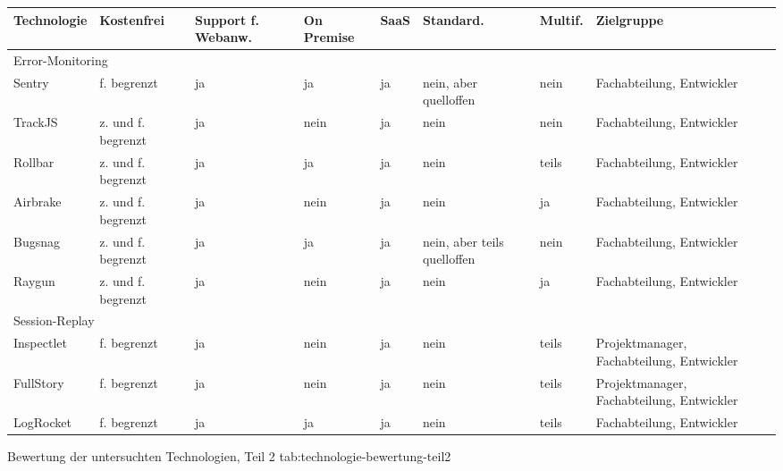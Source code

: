 %
{
\begin{tabular}{|p{2.25cm}|p{2.0cm}|p{2.0cm}|p{2.0cm}|p{1.5cm}|p{2.0cm}|p{1.5cm}|p{2.5cm}|}
\hline
Technologie & Kostenfrei & Support f. Webanw. & On Premise & SaaS & Standard. & Multif. & Zielgruppe \\
\hline
\hline
\multicolumn{7}{|p{15.75cm}|}{Error-Monitoring} \\
\hline
Sentry & f. begrenzt & ja & ja & ja & nein, aber quelloffen & nein & Fachabteilung, Entwickler \\
\hline
TrackJS & z. und f. begrenzt & ja & nein & ja & nein & nein & Fachabteilung, Entwickler \\
\hline
Rollbar & z. und f. begrenzt & ja & ja & ja & nein & teils & Fachabteilung, Entwickler \\
\hline
Airbrake & z. und f. begrenzt & ja & nein & ja & nein & ja & Fachabteilung, Entwickler \\
\hline
Bugsnag & z. und f. begrenzt & ja & ja & ja & nein, aber teils quelloffen & nein & Fachabteilung, Entwickler \\
\hline
Raygun & z. und f. begrenzt & ja & nein & ja & nein & ja & Fachabteilung, Entwickler \\
\hline
\hline
\multicolumn{7}{|p{15.75cm}|}{Session-Replay} \\
\hline
Inspectlet & f. begrenzt & ja & nein & ja & nein & teils & Projektmanager, Fachabteilung, Entwickler \\
\hline
FullStory & f. begrenzt & ja & nein & ja & nein & teils & Projektmanager, Fachabteilung, Entwickler \\
\hline
LogRocket & f. begrenzt & ja & ja & ja & nein & teils & Fachabteilung, Entwickler \\
\hline
\end{tabular}
}
{Bewertung der untersuchten Technologien, Teil 2}
{tab:technologie-bewertung-teil2}